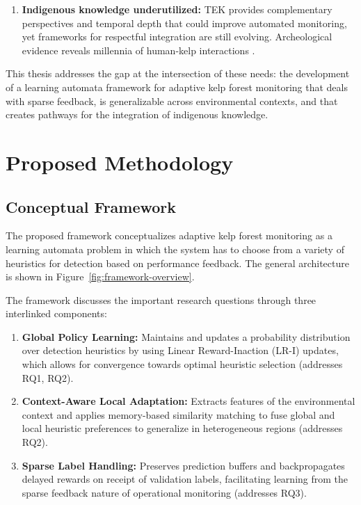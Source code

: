 \documentclass[12pt,oneside]{book}
\begin{document}
\begin{enumerate}
    \item \textbf{Indigenous knowledge underutilized:} TEK provides complementary perspectives and temporal depth that could improve automated monitoring, yet frameworks for respectful integration are still evolving. Archeological evidence reveals millennia of human-kelp interactions \citep{Steneck2002, Jackson2001}.
\end{enumerate}

This thesis addresses the gap at the intersection of these needs: the development of a learning automata framework for adaptive kelp forest monitoring that deals with sparse feedback, is generalizable across environmental contexts, and that creates pathways for the integration of indigenous knowledge.


\chapter{Proposed Methodology}
\label{ch:methodology}

\section{Conceptual Framework}
\label{sec:conceptual-framework}

The proposed framework conceptualizes adaptive kelp forest monitoring as a learning automata problem in which the system has to choose from a variety of heuristics for detection based on performance feedback. The general architecture is shown in Figure~\ref{fig:framework-overview}.

The framework discusses the important research questions through three interlinked components:

\begin{enumerate}
    \item \textbf{Global Policy Learning:} Maintains and updates a probability distribution over detection heuristics by using Linear Reward-Inaction (L$\text{R-I}$) updates, which allows for convergence towards optimal heuristic selection (addresses RQ1, RQ2).

    \item \textbf{Context-Aware Local Adaptation:} Extracts features of the environmental context and applies memory-based similarity matching to fuse global and local heuristic preferences to generalize in heterogeneous regions (addresses RQ2).

    \item \textbf{Sparse Label Handling:} Preserves prediction buffers and backpropagates delayed rewards on receipt of validation labels, facilitating learning from the sparse feedback nature of operational monitoring (addresses RQ3).
\end{enumerate}
\end{document}
